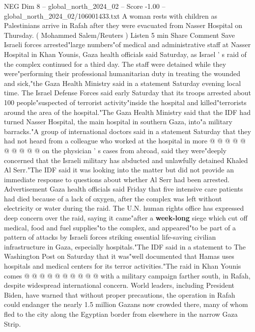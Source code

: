 \begin{textsample}{NEG Dim 8 – global\_north\_2024\_02 – Score -1.00 – global\_north\_2024\_02/106001433.txt}  \label{ex:f8_neg_237}
A woman rests with children as Palestinians arrive in Rafah after they were evacuated from Nasser Hospital on Thursday. ( Mohammed Salem/Reuters ) Listen 5 min Share Comment Save Israeli forces arrested"large numbers"of medical and administrative staff at Nasser Hospital in Khan Younis, Gaza health officials said Saturday, as Israel ' s raid of the complex continued for a third day.
The staff were detained while they were"performing their professional humanitarian duty in treating the wounded and sick,"the Gaza Health Ministry said in a statement Saturday evening local time.
The Israel Defense Forces said early Saturday that its troops arrested about 100 people"suspected of terrorist activity"inside the hospital and killed"terrorists around the area of the hospital."The Gaza Health Ministry said that the IDF had turned Nasser Hospital, the main hospital in southern Gaza, into"a military barracks."A group of international doctors said in a statement Saturday that they had not heard from a colleague who worked at the hospital in more @ @ @ @ @ @ @ @ @ @ on the physician ' s cases from abroad, said they were"deeply concerned that the Israeli military has abducted and unlawfully detained Khaled Al Serr."The IDF said it was looking into the matter but did not provide an immediate response to questions about whether Al Serr had been arrested.
Advertisement Gaza health officials said Friday that five intensive care patients had died because of a lack of oxygen, after the complex was left without electricity or water during the raid.
The U.N. human rights office has expressed deep concern over the raid, saying it came"after a \textbf{week-long} siege which cut off medical, food and fuel supplies"to the complex, and appeared"to be part of a pattern of attacks by Israeli forces striking essential life-saving civilian infrastructure in Gaza, especially hospitals."The IDF said in a statement to The Washington Post on Saturday that it was"well documented that Hamas uses hospitals and medical centers for its terror activities."The raid in Khan Younis comes @ @ @ @ @ @ @ @ @ @ with a military campaign farther south, in Rafah, despite widespread international concern.
World leaders, including President Biden, have warned that without proper precautions, the operation in Rafah could endanger the nearly 1.5 million Gazans now crowded there, many of whom fled to the city along the Egyptian border from elsewhere in the narrow Gaza Strip.

\end{textsample}
